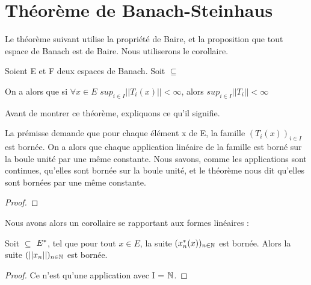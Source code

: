 \section{Théorème de Banach-Steinhaus}

Le théorème suivant utilise la propriété de Baire, et la proposition que tout
espace de Banach est de Baire. Nous utiliserons le corollaire.

\begin{theorem}
	Soient E et F deux espaces de Banach.
	Soit  $\subseteq$ 
	\label{banach-steinhaus}

	On a alors que si $\forall x \in E$ $sup_{i \in I}||T_{i}(x)|| < \infty$,
	alors $sup_{i \in I} ||T_{i}|| < \infty$
\end{theorem}

Avant de montrer ce théorème, expliquons ce qu'il signifie.

La prémisse demande que pour chaque élément x de E, la famille $(T_{i}(x))_{i
\in I}$ est bornée.
On a alors que chaque application linéaire de la famille est borné sur la
boule unité par une même constante. Nous savons, comme les applications sont
continues, qu'elles sont bornée sur la boule unité, et le théorème nous dit
qu'elles sont bornées par une même constante.

\begin{proof}
	
\end{proof}

Nous avons alors un corollaire se rapportant aux formes linéaires :

\begin{corollary}
	Soit  $\subseteq$ $E^{*}$, tel que pour
	tout $x \in E$, la suite $(x_{n}^{*}(x))_{n \in \mathbb{N}}$ est bornée. Alors
	la suite $(||x_{n}||)_{n \in \mathbb{N}}$ est bornée.
\end{corollary}

\begin{proof}
	Ce n'est qu'une application avec I = $\mathbb{N}$.
\end{proof}
